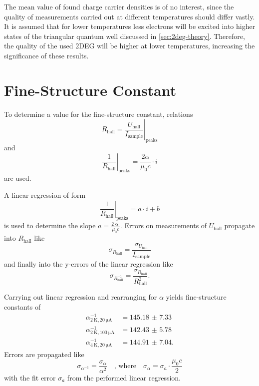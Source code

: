 The mean value of found charge carrier densities is of no interest, since the quality of measurements carried out at different temperatures should differ vastly.
It is assumed that for lower temperatures less electrons will be excited into higher states of the triangular quantum well discussed in \autoref{sec:2deg-theory}.
Therefore, the quality of the used 2DEG will be higher at lower temperatures, increasing the significance of these results.

\section{Fine-Structure Constant}\label{sec:fine} %
To determine a value for the fine-structure constant, relations
\begin{equation*}
	R_\text{hall} = \left. \frac{U_\text{hall}}{I_\text{sample}}\right\rvert_\text{peaks}
\end{equation*}
and
\begin{equation*}
	\left. \frac{1}{R_\text{hall}}\right\rvert_\text{peaks} = \frac{2\alpha}{\mu_0 c}\cdot i
\end{equation*}
are used.

A linear regression of form
\begin{equation*}
	\left. \frac{1}{R_\text{hall}}\right\rvert_\text{peaks} = a\cdot i + b
\end{equation*}
is used to determine the slope $a=\frac{2\upalpha}{\mu_0 c}$.
Errors on measurements of $U_\text{hall}$ propagate into $R_\text{hall}$ like
\begin{equation*}
	\sigma_{R_\text{hall}} = \frac{\sigma_{U_\text{hall}}}{I_\text{sample}}
\end{equation*}
and finally into the y-errors of the linear regression like
\begin{equation*}
	\sigma_{R^{-1}_\text{hall}} = \frac{\sigma_{R_\text{hall}}}{R_\text{hall}^2}.
\end{equation*}

Carrying out linear regression and rearranging for $\alpha$ yields fine-structure constants of
\begin{align*}
	\alpha^{-1}_{\SI{2}{\kelvin},\SI{20}{\micro\ampere}} &= \num{145.18(733)} \\
	\alpha^{-1}_{\SI{2}{\kelvin},\SI{100}{\micro\ampere}} &= \num{142.43(578)} \\
	\alpha^{-1}_{\SI{4}{\kelvin},\SI{20}{\micro\ampere}} &= \num{144.91(704)}.
\end{align*}
Errors are propagated like
\begin{equation*}
	\sigma_{\alpha^{-1}} = \frac{\sigma_\alpha}{\alpha^2}\quad\text{, where}\quad\sigma_\alpha = \sigma_a\cdot\frac{\mu_0c}{2}
\end{equation*}
with the fit error $\sigma_a$ from the performed linear regression.
